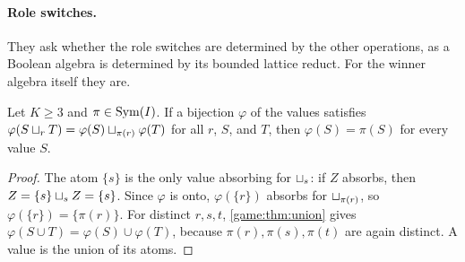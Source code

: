 

\paragraph{Role switches.} They ask whether the role switches are determined by the other operations, as a Boolean algebra is determined by its bounded lattice reduct. For the winner algebra itself they are.

\begin{proposition}\label{olv:prop:renaming}
Let $K\geq3$ and $\pi\in\operatorname{Sym}(I)$. If a bijection $\varphi$ of the values satisfies $\varphi(S\mathbin{\sqcup_{r}} T)=\varphi(S)\mathbin{\sqcup_{\pi(r)}}\varphi(T)$ for all $r$, $S$, and $T$, then $\varphi(S)=\pi(S)$ for every value $S$.
\end{proposition}
\begin{proof}
The atom $\{s\}$ is the only value absorbing for $\mathbin{\sqcup_{s}}$: if $Z$ absorbs, then $Z=\{s\}\mathbin{\sqcup_{s}} Z=\{s\}$. Since $\varphi$ is onto, $\varphi(\{r\})$ absorbs for $\mathbin{\sqcup_{\pi(r)}}$, so $\varphi(\{r\})=\{\pi(r)\}$. For distinct $r,s,t$, \cref{game:thm:union} gives $\varphi(S\cup T)=\varphi(S)\cup\varphi(T)$, because $\pi(r),\pi(s),\pi(t)$ are again distinct. A value is the union of its atoms.
\end{proof}
